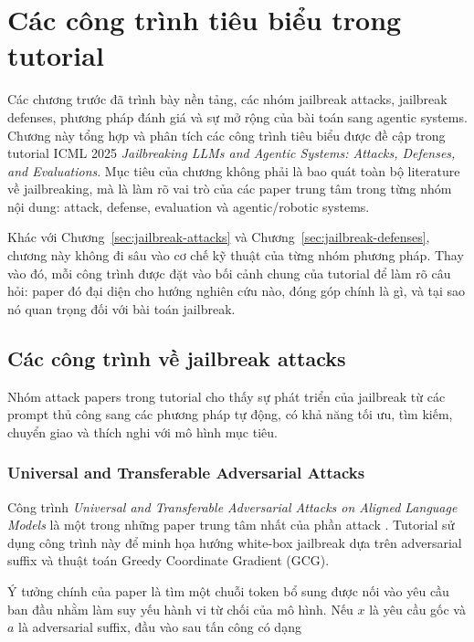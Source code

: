 \section{Các công trình tiêu biểu trong tutorial}
\label{sec:related-papers}

Các chương trước đã trình bày nền tảng, các nhóm jailbreak attacks,
jailbreak defenses, phương pháp đánh giá và sự mở rộng của bài toán sang
agentic systems. Chương này tổng hợp và phân tích các công trình tiêu biểu
được đề cập trong tutorial ICML 2025 \textit{Jailbreaking LLMs and Agentic
Systems: Attacks, Defenses, and Evaluations}. Mục tiêu của chương không
phải là bao quát toàn bộ literature về jailbreaking, mà là làm rõ vai trò
của các paper trung tâm trong từng nhóm nội dung: attack, defense,
evaluation và agentic/robotic systems.

Khác với Chương~\ref{sec:jailbreak-attacks} và
Chương~\ref{sec:jailbreak-defenses}, chương này không đi sâu vào cơ chế kỹ
thuật của từng nhóm phương pháp. Thay vào đó, mỗi công trình được đặt vào
bối cảnh chung của tutorial để làm rõ câu hỏi: paper đó đại diện cho hướng
nghiên cứu nào, đóng góp chính là gì, và tại sao nó quan trọng đối với bài
toán jailbreak.

\subsection{Các công trình về jailbreak attacks}
\label{subsec:attack-papers}

Nhóm attack papers trong tutorial cho thấy sự phát triển của jailbreak từ
các prompt thủ công sang các phương pháp tự động, có khả năng tối ưu, tìm
kiếm, chuyển giao và thích nghi với mô hình mục tiêu.

\subsubsection{Universal and Transferable Adversarial Attacks}

Công trình \textit{Universal and Transferable Adversarial Attacks on
Aligned Language Models} là một trong những paper trung tâm nhất của phần
attack \cite{zou2023universal}. Tutorial sử dụng công trình này để minh
họa hướng white-box jailbreak dựa trên adversarial suffix và thuật toán
Greedy Coordinate Gradient (GCG).

Ý tưởng chính của paper là tìm một chuỗi token bổ sung được nối vào yêu
cầu ban đầu nhằm làm suy yếu hành vi từ chối của mô hình. Nếu $x$ là yêu
cầu gốc và $a$ là adversarial suffix, đầu vào sau tấn công có dạng

